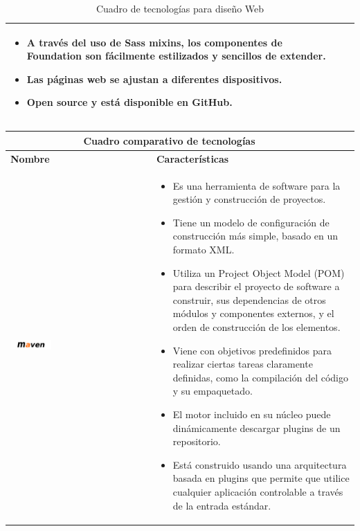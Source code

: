\begin{table}[b!]
\begin{tabular}{|p{1cm}|l}
{\begin{itemize}
            \item A través del uso de Sass mixins, los componentes de Foundation son fácilmente estilizados y sencillos de extender.
            \item Las páginas web se ajustan a diferentes dispositivos.
            \item Open source y está disponible en GitHub.
            \cite{35}
         \end{itemize}}\\ 
        \hline
      \end{tabular}
      \caption{Cuadro de tecnologías para diseño Web}
      \label{table:Cuadro comparativo de tecnologias web}
    \end{table}

\newpage
\begin{table}[b!]
    \centering
    \vspace{-30mm}
      \begin{tabular}{|p{2cm}|ll}
        \hline
        \multicolumn{2}{|c|}{{\bf Cuadro comparativo de tecnologías}} \\ 
        \hline
          \multicolumn{1}{|p{4cm}|}{{\bf Nombre}} & 
		  \multicolumn{1}{p{10cm}|}{{\bf Características}}\\
        \hline
          \multicolumn{1}{|p{5cm}|}{\includegraphics[width=0.3\textwidth]{images/maven}} & 
          \multicolumn{2}{p{10cm}|}{\begin{itemize}
          \vspace{-10mm}
        \item Es una herramienta de software para la gestión y construcción de proyectos.
        \item Tiene un modelo de configuración de construcción más simple, basado en un formato XML.
        \item Utiliza un Project Object Model (POM) para describir el proyecto de software a construir, sus dependencias de otros 				módulos y componentes externos, y el orden de construcción de los elementos.
        \item  Viene con objetivos predefinidos para realizar ciertas tareas claramente definidas, como la compilación del código y su 		empaquetado.
        \item El motor incluido en su núcleo puede dinámicamente descargar plugins de un repositorio.
        \item Está construido usando una arquitectura basada en plugins que permite que utilice cualquier aplicación controlable a través de la entrada estándar. 

\end{itemize}}
\end{tabular}
\end{table}
